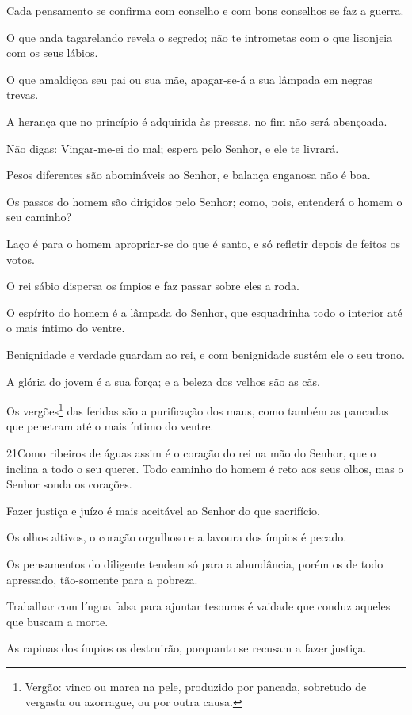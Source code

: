 Cada pensamento se confirma com conselho e com bons conselhos se
faz a guerra.

O que anda tagarelando revela o segredo; não te intrometas com o
que lisonjeia com os seus lábios.

O que amaldiçoa seu pai ou sua mãe, apagar-se-á a sua lâmpada em
negras trevas.

A herança que no princípio é adquirida às pressas, no fim não
será abençoada.

Não digas: Vingar-me-ei do mal; espera pelo Senhor, e ele te
livrará.

Pesos diferentes são abomináveis ao Senhor, e balança enganosa
não é boa.

Os passos do homem são dirigidos pelo Senhor; como, pois,
entenderá o homem o seu caminho?

Laço é para o homem apropriar-se do que é santo, e só refletir
depois de feitos os votos.

O rei sábio dispersa os ímpios e faz passar sobre eles a roda.

O espírito do homem é a lâmpada do Senhor, que esquadrinha todo o
interior até o mais íntimo do ventre.

Benignidade e verdade guardam ao rei, e com benignidade sustém
ele o seu trono.

A glória do jovem é a sua força; e a beleza dos velhos são as
cãs.

Os vergões\footnote{Vergão: vinco ou marca na pele, produzido por
pancada, sobretudo de vergasta ou azorrague, ou por outra causa.}
das feridas são a purificação dos maus, como também as pancadas que
penetram até o mais íntimo do ventre.

\medskip

\lettrine{21}{}Como ribeiros de águas assim é o coração do rei
na mão do Senhor, que o inclina a todo o seu querer. \textparagraph
Todo caminho do homem é reto aos seus olhos, mas o Senhor sonda os
corações.

Fazer justiça e juízo é mais aceitável ao Senhor do que
sacrifício.

Os olhos altivos, o coração orgulhoso e a lavoura dos ímpios é
pecado.

Os pensamentos do diligente tendem só para a abundância, porém os
de todo apressado, tão-somente para a pobreza.

Trabalhar com língua falsa para ajuntar tesouros é vaidade que
conduz aqueles que buscam a morte.

As rapinas dos ímpios os destruirão, porquanto se recusam a fazer
justiça.

